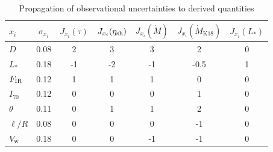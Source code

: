 \begin{table}
  \centering
  \caption[Derived]{Propagation of observational uncertainties to derived quantities}
  \label{tab:derived-parameters}
  \setlength\tabcolsep{3pt}
  \begin{tabular}{l S S S S S S}
    \toprule
    \(x_i\) & {\(\sigma_{x_i}\)}
    & {\(J_{x_i} (\tau)\)} & {\(J_{x_i} (\eta_{\text{sh}})\)}
    & {\(J_{x_i} (\dot M)\)} & {\(J_{x_i} (\dot M_{\text{K18}})\)}
    & {\(J_{x_i} (L_*)\)}
    \\
    \midrule
    \(D\)     & 0.08 & 2  & 3 & 3 & 2 & 0\\
    \(L_*\)   & 0.18 & -1 & -2 & -1 & -0.5 & 1\\
    \(F_{\text{IR}}\)  & 0.12 & 1 & 1 & 1 & 0 & 0\\
    \(I_{70}\) & 0.12 & 0 & 0 & 0 & 1 & 0\\
    \(\theta\) & 0.11 & 0 & 1 & 1 & 2 & 0\\
    \(\ell/R\) & 0.08 & 0 & 0 & 0 & -1 & 0\\
    \(V_{\text{w}}\) & 0.18 & 0 & 0 & -1 & -1 & 0\\
    \bottomrule
  \end{tabular}
\end{table}



